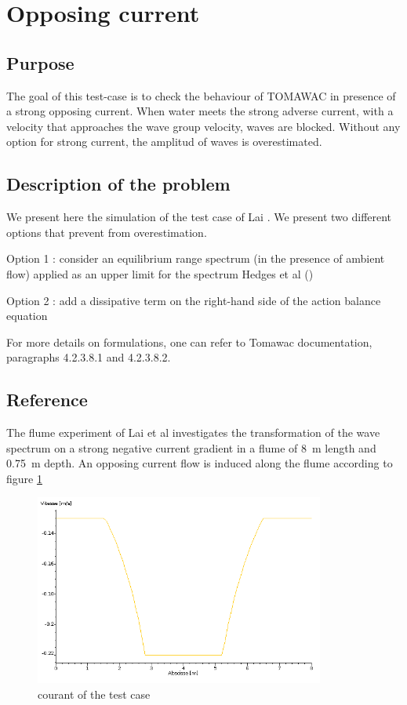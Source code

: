 \section{Opposing current}
%

%
\subsection{Purpose}
%
The goal of this test-case is to check the behaviour of TOMAWAC in presence of a strong opposing current. When water meets the strong adverse current, with a velocity that approaches the wave group velocity, waves are blocked. Without any option for strong current, the amplitud of waves is overestimated.

%
\subsection{Description of the problem}
%
We present here the simulation of the test case of Lai \cite{Lai1989}. We present two different options that prevent from overestimation.

Option 1 : consider an equilibrium range spectrum (in the presence of ambient flow) applied as an upper limit for the spectrum Hedges et al  (\cite{Hedges1985})

Option 2 : add a dissipative term on the right-hand side of the action balance equation \cite{Westhuys2012}

For more details on formulations, one can refer to Tomawac documentation, paragraphs 4.2.3.8.1 and 4.2.3.8.2.

%
\subsection{Reference}
%
The flume experiment of Lai et al \cite{Lai1989} investigates the transformation of the wave spectrum on a strong negative current gradient in a flume of 8~m length and 0.75~m depth. An opposing current flow is induced along the flume according to figure \ref{courant}
\begin{figure} [!h]
\centering
\includegraphics[width=0.85\textwidth]{courant.png}
 \caption{courant of the test case }
\label{courant}
\end{figure}

